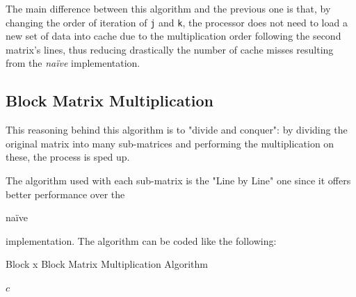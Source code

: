 \documentclass[11pt,a4paper]{article}
\begin{document}
The main difference between this algorithm and the previous one is that, by changing the order of iteration of \lstinline{j} and \lstinline{k}, the processor does not need to load a new set of data into cache due to the multiplication order following the second matrix's lines, thus reducing drastically the number of cache misses resulting from the \emph{naïve} implementation.

\subsection{Block Matrix Multiplication}

This reasoning behind this algorithm is to "divide and conquer": by dividing the original matrix into many sub-matrices and performing the multiplication on these, the process is sped up. 

The algorithm used with each sub-matrix is the "Line by Line" one since it offers better performance over the \begin{em}naïve\end{em} implementation. The algorithm can be coded like the following:

\begin{algorithm}[H]
\caption{Block x Block Matrix Multiplication Algorithm}
\begin{algorithmic}[1]
                            \EndFor
                        \EndFor
                    \EndFor
                \EndFor
            \EndFor
        \EndFor
        \State \Return $c$
    \EndFunction
\end{algorithmic}
\end{algorithm}
\end{document}
